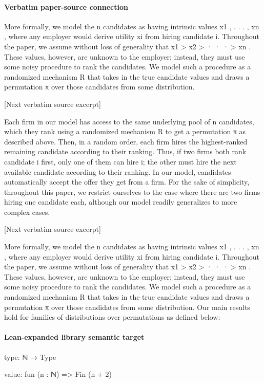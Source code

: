 \documentclass[10pt]{article}
\begin{document}
\paragraph{Verbatim paper-source connection}
\begin{ReviewVerbatim}
More formally, we model the n candidates as having intrinsic values x1 , . . . , xn , where any employer would
derive utility xi from hiring candidate i. Throughout the paper, we assume without loss of generality that
x1 > x2 > · · · > xn . These values, however, are unknown to the employer; instead, they must use some
noisy procedure to rank the candidates. We model such a procedure as a randomized mechanism R that
takes in the true candidate values and draws a permutation π over those candidates from some distribution.

[Next verbatim source excerpt]

Each firm in our model has access to the same underlying pool of n candidates, which they rank using
a randomized mechanism R to get a permutation π as described above. Then, in a random order, each
firm hires the highest-ranked remaining candidate according to their ranking. Thus, if two firms both rank
candidate i first, only one of them can hire i; the other must hire the next available candidate according to
their ranking. In our model, candidates automatically accept the offer they get from a firm. For the sake
of simplicity, throughout this paper, we restrict ourselves to the case where there are two firms hiring one
candidate each, although our model readily generalizes to more complex cases.

[Next verbatim source excerpt]

More formally, we model the n candidates as having intrinsic values x1 , . . . , xn , where any employer would
derive utility xi from hiring candidate i. Throughout the paper, we assume without loss of generality that
x1 > x2 > · · · > xn . These values, however, are unknown to the employer; instead, they must use some
noisy procedure to rank the candidates. We model such a procedure as a randomized mechanism R that
takes in the true candidate values and draws a permutation π over those candidates from some distribution.
Our main results hold for families of distributions over permutations as defined below:
\end{ReviewVerbatim}



\paragraph{Lean-expanded library semantic target}
\begin{ReviewVerbatim}
type:
ℕ → Type

value:
fun (n : ℕ) => Fin (n + 2)
\end{ReviewVerbatim}
\end{document}
